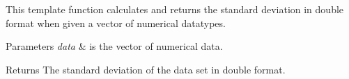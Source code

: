 This template function calculates and returns the standard deviation in double format when given a vector of numerical datatypes. 


\begin{DoxyParams}{Parameters}
{\em data} & is the vector of numerical data. \\
\hline
\end{DoxyParams}
\begin{DoxyReturn}{Returns}
The standard deviation of the data set in double format. 
\end{DoxyReturn}

